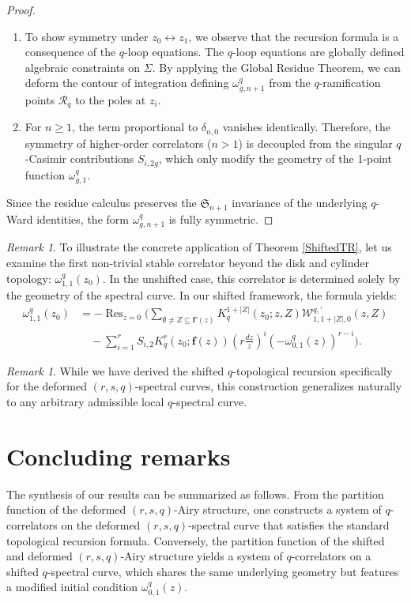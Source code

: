 \documentclass[reqno,11pt]{amsart}
\theoremstyle{plain}
\theoremstyle{definition}
\theoremstyle{remark}
\newtheorem{remark}[theorem]{Remark}
\numberwithin{equation}{section}
\newcommand{\1}{\mathds{1}}
\newcommand{\2}{\frac{1}{2}}
\DeclareMathOperator*{\Res}{Res}
\begin{document}
{\begin{proof}
\begin{enumerate}
										\item To show symmetry under $z_0 \leftrightarrow z_1$, we observe that the recursion formula is a consequence of the $q$-loop equations. The $q$-loop equations are globally defined algebraic constraints on $\Sigma$. By applying the Global Residue Theorem, we can deform the contour of integration defining $\omega^q_{g,n+1}$ from the $q$-ramification points $\mathcal{R}_q$ to the poles at $z_i$. 
										
										\item  For $n \geq 1$, the term proportional to $\delta_{n,0}$ vanishes identically. Therefore, the symmetry of higher-order correlators ($n > 1$) is decoupled from the singular $q$-Casimir contributions $S_{i,2g}$, which only modify the geometry of the 1-point function $\omega^q_{g,1}$.
									\end{enumerate}
									Since the residue calculus preserves the $\mathfrak{S}_{n+1}$ invariance of the underlying $q$-Ward identities, the form $\omega^q_{g,n+1}$ is fully symmetric.
								\end{proof}
								\begin{remark}
									To illustrate the concrete application of Theorem \ref{ShiftedTR}, let us examine the first non-trivial stable correlator beyond the disk and cylinder topology: $\omega^{q}_{1,1}(z_0)$. In the unshifted case, this correlator is determined solely by the geometry of the spectral curve. In our shifted framework, the formula yields:
									\begin{align}
										\omega^q_{1,1}(z_0) &= -\Res_{z=0} \Bigg( \sum_{\emptyset \neq Z \subseteq \mathbf{f}'(z)} K^{1+|Z|}_q(z_0; z, Z) \mathcal{W}^{q,'}_{1,1+|Z|,0}(z, Z) \nonumber \\
										&\quad - \sum_{i=1}^r S_{i,2} K^r_q(z_0; \mathbf{f}(z)) \left( r \frac{dz}{z} \right)^i \left( -\omega^q_{0,1}(z) \right)^{r-i} \Bigg).
									\end{align}
								\end{remark}
								\begin{remark}
									While we have derived the shifted $q$-topological recursion specifically for the deformed $(r,s,q)$-spectral curves, this construction generalizes naturally to any arbitrary admissible local $q$-spectral curve.
								\end{remark}
								
								\section{Concluding remarks}
								The synthesis of our results can be summarized as follows. From the partition function of the deformed $(r,s,q)$-Airy structure, one constructs a system of $q$-correlators on the deformed $(r,s,q)$-spectral curve that satisfies the standard topological recursion formula. Conversely, the partition function of the shifted and deformed $(r,s,q)$-Airy structure yields a system of $q$-correlators on a shifted $q$-spectral curve, which shares the same underlying geometry but features a modified initial condition $\omega^{q}_{0,1}(z)$.
								
}
\end{document}
